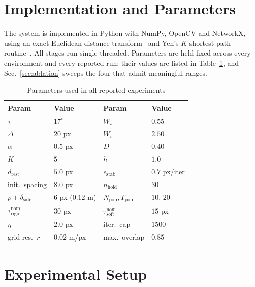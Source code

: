 \documentclass[conference]{IEEEtran}
\begin{document}
\section{Implementation and Parameters}
\label{sec:impl}

The system is implemented in Python with NumPy, OpenCV and NetworkX, using an exact Euclidean distance transform~\cite{felzenszwalb2012} and Yen's $K$-shortest-path routine~\cite{yen1971}. All stages run single-threaded. Parameters are held fixed across every environment and every reported run; their values are listed in Table~\ref{tab:params}, and Sec.~\ref{sec:ablation} sweeps the four that admit meaningful ranges.

\begin{table}[htbp]
\caption{Parameters used in all reported experiments}
\label{tab:params}
\begin{center}
\begin{tabular}{@{}llll@{}}
\toprule
\textbf{Param} & \textbf{Value} & \textbf{Param} & \textbf{Value} \\ \midrule
$\tau$ & $17^\circ$ & $W_s$ & $0.55$ \\
$\Delta$ & $20$ px & $W_r$ & $2.50$ \\
$\alpha$ & $0.5$ px & $D$ & $0.40$ \\
$K$ & $5$ & $h$ & $1.0$ \\
$d_{\mathrm{rest}}$ & $5.0$ px & $\epsilon_{\mathrm{stab}}$ & $0.7$ px/iter \\
init.\ spacing & $8.0$ px & $n_{\mathrm{hold}}$ & $30$ \\
$\rho+\delta_{\mathrm{safe}}$ & $6$ px ($0.12$ m) & $N_{\mathrm{pop}},T_{\mathrm{pop}}$ & $10,\,20$ \\
$\tau^{\mathrm{nom}}_{\mathrm{rigid}}$ & $30$ px & $\tau^{\mathrm{nom}}_{\mathrm{soft}}$ & $15$ px \\
$\eta$ & $2.0$ px & iter.\ cap & $1500$ \\
grid res.\ $r$ & $0.02$ m/px & max.\ overlap & $0.85$ \\ \bottomrule
\end{tabular}
\end{center}
\end{table}

\section{Experimental Setup}
\label{sec:setup}
\end{document}
